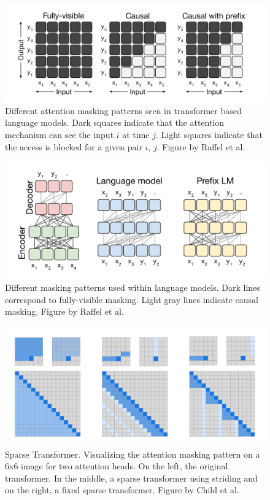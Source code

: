 \documentclass[twoside]{article}
\begin{document}
\begin{figure}[h]
  \centering
  \includegraphics*[scale=0.15]{img/attention_masking.png}
  \caption{
    Different attention masking patterns seen in transformer based language models.
    Dark squares indicate that the attention mechanism can see the input $i$ at time $j$.
    Light squares indicate that the access is blocked for a given pair $i$, $j$. 
    Figure by Raffel et al. \cite{raffel_exploring_2020}
  }
  \label{masking_patterns_raw}
\end{figure}
\begin{figure}[h]
  \centering
  \includegraphics*[scale=0.15]{img/lm_masking.png}
  \caption{
    Different masking patterns used within language models. Dark lines correspond to 
    fully-visible masking. Light gray lines indicate causal masking.
    Figure by Raffel et al. \cite{raffel_exploring_2020}
  }
  \label{masking_patterns}
\end{figure}

\begin{figure}[h]
  \centering
  \includegraphics*[scale=0.1]{img/sparse_transformer.png}
  \caption{
    Sparse Transformer. Visualizing the attention masking pattern on a 6x6 image
    for two attention heads. On the left, the original transformer. In the middle,
    a sparse transformer using striding and on the right, a fixed sparse transformer.
    Figure by Child et al. \cite{child_generating_2019}
  }
  \label{sparse_transformer}
\end{figure}
\end{document}
